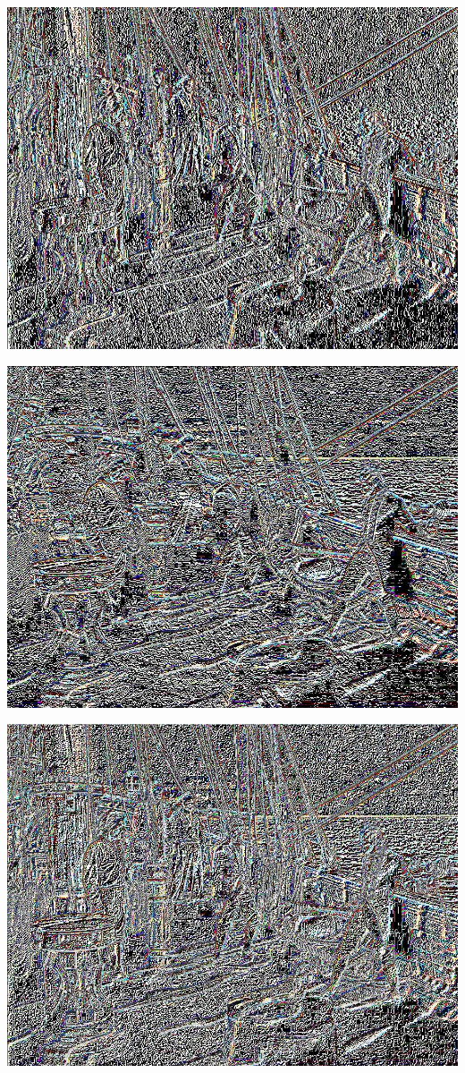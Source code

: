 \documentclass[a4paper,12pt]{article}
\begin{document}
\begin{center}
\includegraphics[width=0.8\linewidth,height=0.7\textheight]{Preconditioning/test_SUB}
\end{center}

\begin{center}
\includegraphics[width=0.8\linewidth,height=0.7\textheight]{Preconditioning/test_UP}
\end{center}

\begin{center}
\includegraphics[width=0.8\linewidth,height=0.7\textheight]{Preconditioning/test_AVERAGE2}
\end{center}
\end{document}
